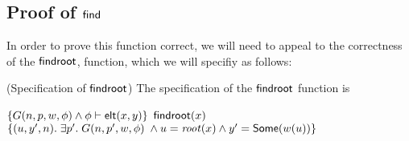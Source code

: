 \subsection{Proof of $\mathsf{find}$}

In order to prove this function correct, we will need to appeal to the
correctness of the $\mathsf{findroot}$, function, which we will specifiy as
follows:

\begin{prop}{(Specification of $\mathsf{findroot}$)}
  The specification of the $\mathsf{findroot}$ function is 

  \begin{specification}
    \nextline $\{G(n, p, w, \phi) \land {\phi} \vdash \mathsf{elt}({x}, {y})\}$
    \nextline $\mathsf{findroot}(x)$ 
    \nextline $\{(u, y', n).\; \exists p'.\;G(n, p', w, \phi) \;\land
                       u = \mathit{root}(x) \land y' = \mathsf{Some}(w(u))\}$
  \end{specification}
\end{prop}

